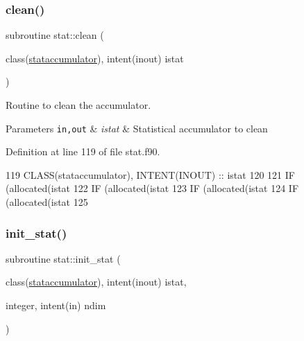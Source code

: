 \subsubsection{\texorpdfstring{clean()}{clean()}}
{\footnotesize\ttfamily subroutine stat\+::clean (\begin{DoxyParamCaption}\item[{class(\hyperlink{structstat_1_1stataccumulator}{stataccumulator}), intent(inout)}]{istat }\end{DoxyParamCaption})\hspace{0.3cm}{\ttfamily [private]}}



Routine to clean the accumulator. 


\begin{DoxyParams}[1]{Parameters}
\mbox{\tt in,out}  & {\em istat} & Statistical accumulator to clean \\
\hline
\end{DoxyParams}


Definition at line 119 of file stat.\+f90.


\begin{DoxyCode}
119       \textcolor{keywordtype}{CLASS}(stataccumulator), \textcolor{keywordtype}{INTENT(INOUT)} :: istat
120 
121       \textcolor{keywordflow}{IF} (\textcolor{keyword}{allocated}(istat%
122       \textcolor{keywordflow}{IF} (\textcolor{keyword}{allocated}(istat%
123       \textcolor{keywordflow}{IF} (\textcolor{keyword}{allocated}(istat%
124       \textcolor{keywordflow}{IF} (\textcolor{keyword}{allocated}(istat%
125 
\end{DoxyCode}
\mbox{\label{namespacestat_a5cf2b5befc54e196ab5d421b225d77a6}} 
\subsubsection{\texorpdfstring{init\+\_\+stat()}{init\_stat()}}
{\footnotesize\ttfamily subroutine stat\+::init\+\_\+stat (\begin{DoxyParamCaption}\item[{class(\hyperlink{structstat_1_1stataccumulator}{stataccumulator}), intent(inout)}]{istat,  }\item[{integer, intent(in)}]{ndim }\end{DoxyParamCaption})}



